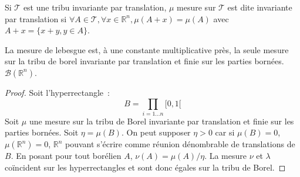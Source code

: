 Si $\mathcal{T}$ est  une tribu invariante par translation,
$\mu$ mesure sur $\mathcal{T}$ est dite invariante par translation si
$\forall A \in \mathcal{T}, \forall x \in \mathbb{R}^n, \mu(A+x) =
\mu(A)$ avec $A+x = \{ x + y, y \in A \}$. 
\begin{mandatory}
\begin{prop}
La mesure de lebesgue est, à une constante multiplicative près, la
seule mesure sur la tribu de borel invariante par translation et finie
sur les parties bornées.
$\mathcal{B}(\mathbb{R}^n)$. 
\end{prop}
\end{mandatory}
\begin{proof}
Soit l'hyperrectangle~:
\[
B = \prod_{i=1 \dots n} [0,1[
\]
Soit $\mu$ une mesure sur la tribu de Borel invariante par
translation et finie sur les parties bornées. 
Soit $\eta = \mu(B)$. On peut supposer $\eta > 0$ car si $\mu(B) = 0$,
$\mu(\mathbb{R}^n) = 0 $, $\mathbb{R}^n$ pouvant s'écrire comme
réunion dénombrable de translations de $B$. En posant pour tout
borélien $A$, $\nu(A) = \mu(A) / \eta$. La mesure $\nu$ et $\lambda$
coïncident sur les hyperrectangles et sont donc égales sur la tribu de
Borel.
\end{proof}
